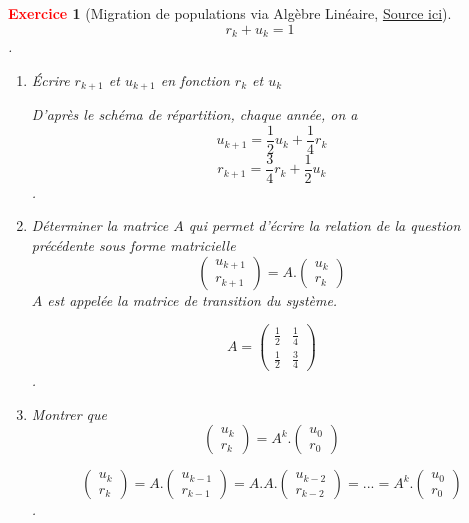\documentclass[11pt]{article}
\theoremstyle{mythmstyle}
\newtheorem{exo}{\textcolor{red}{\textbf{Exercice}}}
\begin{document}
\begin{exo}[Migration de populations via Algèbre Linéaire, \href{http://math.univ-lyon1.fr/homes-www/malbos/Ens/amalaa11.pdf}{Source ici}]
$$r_k + u_k = 1$$.
\begin{enumerate}
    \item  Écrire $r_{k+1}$ et $u_{k+1}$ en fonction $r_k$ et $u_k$
    \begin{solution}
        D'après le schéma de répartition, chaque année, on a
        $$
        u_{k+1}=\frac{1}{2}u_k + \frac{1}{4}r_k
        $$
        $$
        r_{k+1}=\frac{3}{4}r_k + \frac{1}{2}u_k
        $$.\\
        \hfill
\end{solution}
\item  Déterminer la matrice $A$ qui permet d'écrire la relation de la question précédente sous forme matricielle
    $$\begin{pmatrix} u_{k+1}\\r_{k+1}\end{pmatrix}=A.\begin{pmatrix} u_k\\r_k\end{pmatrix} $$
   \noindent $A$ est appelée la matrice de transition du système.
   
        \begin{solution}
       $$A=
       \begin{pmatrix}\frac{1}{2}&\frac{1}{4} \\ \frac{1}{2}& \frac{3}{4}\end{pmatrix}
        $$.
        \hfill
\end{solution}
   
    \item Montrer que 
     $$\begin{pmatrix} u_{k}\\r_{k}\end{pmatrix}=A^k.\begin{pmatrix} u_0\\r_0\end{pmatrix} $$

\begin{solution}
     $$\begin{pmatrix} u_{k}\\r_{k}\end{pmatrix}=A.\begin{pmatrix} u_{k-1}\\r_{k-1}\end{pmatrix}=A.A.\begin{pmatrix}u_{k-2}\\r_{k-2}\end{pmatrix}=...= A^k. \begin{pmatrix} u_0\\r_0\end{pmatrix} 
     $$.
     \hfill
\end{solution}


\end{enumerate}
\end{exo}
\end{document}
